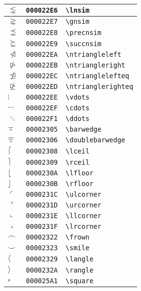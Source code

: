 \begin{longtable}{|l|l|l|}
$\lnsim$ & \texttt{000022E6} & \verb|\lnsim| \\
\hline
$\gnsim$ & \texttt{000022E7} & \verb|\gnsim| \\
\hline
$\precnsim$ & \texttt{000022E8} & \verb|\precnsim| \\
\hline
$\succnsim$ & \texttt{000022E9} & \verb|\succnsim| \\
\hline
$\ntriangleleft$ & \texttt{000022EA} & \verb|\ntriangleleft| \\
\hline
$\ntriangleright$ & \texttt{000022EB} & \verb|\ntriangleright| \\
\hline
$\ntrianglelefteq$ & \texttt{000022EC} & \verb|\ntrianglelefteq| \\
\hline
$\ntrianglerighteq$ & \texttt{000022ED} & \verb|\ntrianglerighteq| \\
\hline
$\vdots$ & \texttt{000022EE} & \verb|\vdots| \\
\hline
$\cdots$ & \texttt{000022EF} & \verb|\cdots| \\
\hline
$\ddots$ & \texttt{000022F1} & \verb|\ddots| \\
\hline
$\barwedge$ & \texttt{00002305} & \verb|\barwedge| \\
\hline
$\doublebarwedge$ & \texttt{00002306} & \verb|\doublebarwedge| \\
\hline
$\lceil$ & \texttt{00002308} & \verb|\lceil| \\
\hline
$\rceil$ & \texttt{00002309} & \verb|\rceil| \\
\hline
$\lfloor$ & \texttt{0000230A} & \verb|\lfloor| \\
\hline
$\rfloor$ & \texttt{0000230B} & \verb|\rfloor| \\
\hline
$\ulcorner$ & \texttt{0000231C} & \verb|\ulcorner| \\
\hline
$\urcorner$ & \texttt{0000231D} & \verb|\urcorner| \\
\hline
$\llcorner$ & \texttt{0000231E} & \verb|\llcorner| \\
\hline
$\lrcorner$ & \texttt{0000231F} & \verb|\lrcorner| \\
\hline
$\frown$ & \texttt{00002322} & \verb|\frown| \\
\hline
$\smile$ & \texttt{00002323} & \verb|\smile| \\
\hline
$\langle$ & \texttt{00002329} & \verb|\langle| \\
\hline
$\rangle$ & \texttt{0000232A} & \verb|\rangle| \\
\hline
$\square$ & \texttt{000025A1} & \verb|\square| \\

\end{longtable}
